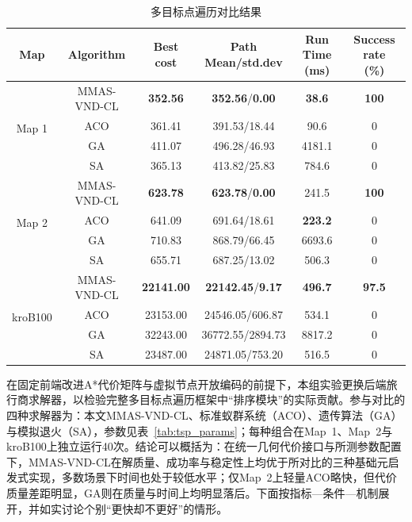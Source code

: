 \documentclass[lettersize,journal]{IEEEtran}
\begin{document}
\begin{table}[!t]
\caption{多目标点遍历对比结果}
\label{tab:tsp_cmp}
\centering
\scriptsize
\setlength{\tabcolsep}{2.5pt}
\begin{tabular}{cccccc}
\toprule
Map & Algorithm & Best cost & \makecell{Path\\Mean/std.dev} & \makecell{Run Time\\(ms)} & \makecell{Success rate\\(\%)} \\
\midrule
 \multirow{4}{*}{Map 1} & MMAS-VND-CL & \textbf{352.56} & \textbf{352.56}/\textbf{0.00} & \textbf{38.6} & \textbf{100} \\
   & ACO & 361.41 & 391.53/18.44 & 90.6 & 0 \\
   & GA & 411.07 & 496.28/46.93 & 4181.1 & 0 \\
   & SA & 365.13 & 413.82/25.83 & 784.6 & 0 \\
\midrule
 \multirow{4}{*}{Map 2} & MMAS-VND-CL & \textbf{623.78} & \textbf{623.78}/\textbf{0.00} & 241.5 & \textbf{100} \\
   & ACO & 641.09 & 691.64/18.61 & \textbf{223.2} & 0 \\
   & GA & 710.83 & 868.79/66.45 & 6693.6 & 0 \\
   & SA & 655.71 & 687.25/13.02 & 506.3 & 0 \\
\midrule
 \multirow{4}{*}{kroB100} & MMAS-VND-CL & \textbf{22141.00} & \textbf{22142.45}/\textbf{9.17} & \textbf{496.7} & \textbf{97.5} \\
   & ACO & 23153.00 & 24546.05/606.87 & 534.1 & 0 \\
   & GA & 32243.00 & 36772.55/2894.73 & 8817.2 & 0 \\
   & SA & 23487.00 & 24871.05/753.20 & 516.5 & 0 \\
\bottomrule
\end{tabular}
\end{table}

在固定前端改进A*代价矩阵与虚拟节点开放编码的前提下，本组实验更换后端旅行商求解器，以检验完整多目标点遍历框架中“排序模块”的实际贡献。参与对比的四种求解器为：本文MMAS-VND-CL、标准蚁群系统（ACO）、遗传算法（GA）与模拟退火（SA），参数见表~\textcolor{blue}{\ref{tab:tsp_params}}；每种组合在Map~1、Map~2与kroB100上独立运行40次。结论可以概括为：在统一几何代价接口与所测参数配置下，MMAS-VND-CL在解质量、成功率与稳定性上均优于所对比的三种基础元启发式实现，多数场景下时间也处于较低水平；仅Map~2上轻量ACO略快，但代价质量差距明显，GA则在质量与时间上均明显落后。下面按指标—条件—机制展开，并如实讨论个别“更快却不更好”的情形。
\end{document}
